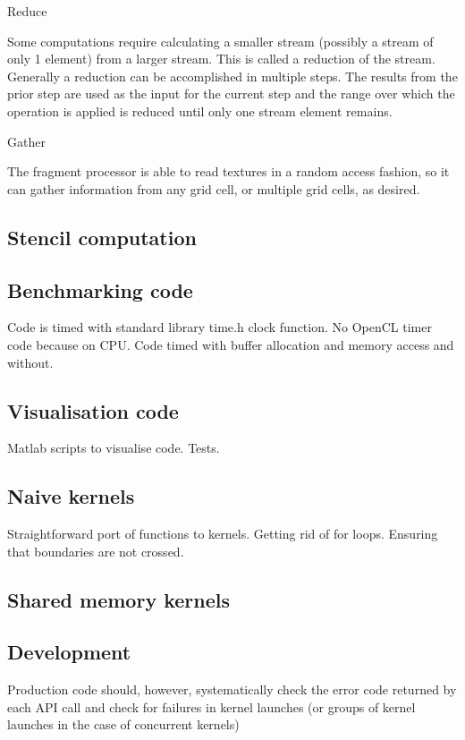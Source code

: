 Reduce

Some computations require calculating a smaller stream (possibly a stream of only 1 element) from a larger stream. This is called a reduction of the stream. Generally a reduction can be accomplished in multiple steps. The results from the prior step are used as the input for the current step and the range over which the operation is applied is reduced until only one stream element remains.

Gather

The fragment processor is able to read textures in a random access fashion, so it can gather information from any grid cell, or multiple grid cells, as desired.

\subsection{Stencil computation}


\subsection{Benchmarking code}
Code is timed with standard library time.h clock function.
No OpenCL timer code because on CPU. Code timed with buffer allocation and memory access and without.

\subsection{Visualisation code}
Matlab scripts to visualise code. Tests.

\subsection{Naive kernels}
Straightforward port of functions to kernels. Getting rid of for loops. Ensuring that boundaries are not crossed.


\subsection{Shared memory kernels}

\subsection{Development}
Production code should, however, systematically check the error code returned by each API call and check for failures in kernel launches (or groups of kernel launches in the case of concurrent kernels) 